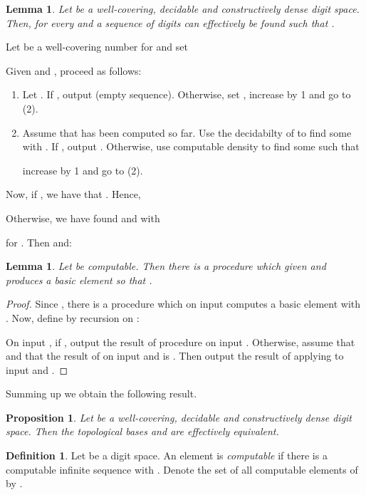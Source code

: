 \documentclass[microtype]{jloganal}
\theoremstyle{plain}
\newtheorem{lemma}[theorem]{Lemma}
\newtheorem{proposition}[theorem]{Proposition}
\theoremstyle{definition}
\newtheorem{definition}[theorem]{Definition}
\begin{document}
\begin{lemma}
\label{lem-Q-QD}
Let  be a well-covering, decidable and constructively dense digit space. Then, for every  and  a sequence  of digits can effectively be found such that .
\end{lemma}
\proof
Let  be a well-covering number for  and set

Given  and , proceed as follows:
\begin{enumerate}
\item Let .  If , output  (empty sequence). Otherwise, set , increase  by 1 and go to (2).

\item Assume that  has been computed so far. Use the decidabilty of  to find some  with .
If , output . Otherwise, use computable density to find some  such that

increase  by 1 and go to (2).

\end{enumerate}

Now, if , we have that . Hence,

Otherwise, we have found  and  with

for . Then  and: 



\begin{lemma}
\label{lem-QD-Q}
Let  be computable. Then there is a procedure  which given  and  produces a basic element  so that .
\end{lemma}
\begin{proof}
Since , there is a procedure  which on input  computes a basic element  with . Now, define  by recursion on :

On input , if , output the result of procedure  on input . Otherwise, assume that  and that the result of  on input  and  is . Then output the result of applying  to input  and . 
\end{proof}

Summing up we obtain the following result.

\begin{proposition}\label{prop-baseeq}
Let  be a well-covering, decidable and constructively dense digit space. Then the topological bases  and  are effectively equivalent.
\end{proposition}

\begin{definition}
\label{def-computable-element}
Let  be a digit space. An element  is \emph{computable} if there is a computable infinite sequence  with . Denote the set of all computable elements of  by .
\end{definition}
\end{document}
